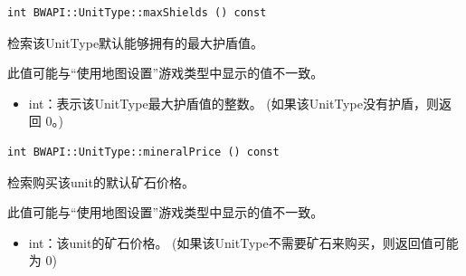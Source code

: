 \begin{tcolorbox}[colback=white, colframe=black!60!white, title=maxShields(), arc=0mm]
    \begin{verbatim}
int BWAPI::UnitType::maxShields () const
    \end{verbatim}
    检索该UnitType默认能够拥有的最大护盾值。
    \begin{note}
        此值可能与“使用地图设置”游戏类型中显示的值不一致。
    \end{note}
    \begin{return}
        \begin{itemize}
            \item int：表示该UnitType最大护盾值的整数。
            (如果该UnitType没有护盾，则返回 0。)
        \end{itemize}
    \end{return}
\end{tcolorbox}


\begin{tcolorbox}[colback=white, colframe=black!60!white, title=mineralPrice(), arc=0mm]
    \begin{verbatim}
int BWAPI::UnitType::mineralPrice () const
    \end{verbatim}
    检索购买该unit的默认矿石价格。
    \begin{note}
        此值可能与“使用地图设置”游戏类型中显示的值不一致。
    \end{note}
    \begin{return}
        \begin{itemize}
            \item int：该unit的矿石价格。
            (如果该UnitType不需要矿石来购买，则返回值可能为 0)
        \end{itemize}
    \end{return}
\end{tcolorbox}


